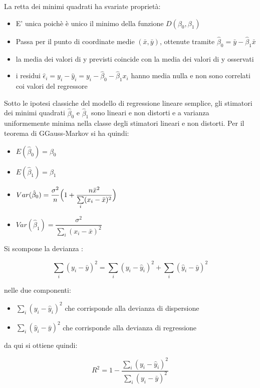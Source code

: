 \documentclass[a4paper]{extarticle}
\begin{document}
La retta dei minimi quadrati ha svariate proprietà:
\begin{itemize}
\item E' unica poichè è unico il minimo della funzione $D(\beta_0,\beta_1)$
\item Passa per il punto di coordinate medie $(\bar x, \bar y)$, ottenute tramite $\hat \beta_0 = \bar y - \hat \beta_1 \bar x$
\item la media dei valori di y previsti coincide con la media dei valori di y osservati
\item i residui $\hat \epsilon_i = y_i - \hat y_i = y_i - \hat \beta_0 - \hat \beta_1 x_i$ hanno media nulla e non sono correlati coi valori del regressore
\end{itemize} 

Sotto le ipotesi classiche del modello di regressione lineare semplice, gli stimatori dei minimi quadrati $\hat \beta_0$ e $\hat \beta_1$ sono lineari e non distorti e a varianza uniformemente minima nella classe degli stimatori lineari e non distorti. Per il teorema di GGauss-Markov si ha quindi:
\begin{itemize}
\item $E(\hat \beta_0) = \beta_0$
\item $E(\hat \beta_1) = \beta_1$ 
\item $Var(\hat \beta_0) =  \dfrac{\sigma^2}{n}\Bigl(1+\dfrac{n \bar x^2}{\sum\limits_i(x_i-\bar x)^2}\Bigr)$ 
\item $Var(\hat \beta_1) = \dfrac{\sigma^2}{\sum\limits_i (x_i- \bar x)^2}$ 
\end{itemize}

Si scompone la devianza :

\begin{equation*}
\sum\limits_i (y_i - \bar y)^2 = \sum\limits_i(y_i - \hat y_i)^2 + \sum\limits_i(\hat y_i - \bar y)^2
\end{equation*}

 nelle due componenti:
 
 \begin{itemize}
 \item $\sum\limits_i(y_i - \hat y_i)^2$ che corrisponde alla devianza di dispersione
 \item $ \sum\limits_i(\hat y_i - \bar y)^2$ che corrisponde alla devianza di regressione
 \end{itemize}
 
 da qui si ottiene quindi:
 
 \begin{equation*}
R^2 = 1 - \dfrac{\sum\limits_i(y_i - \hat y_i)^2}{\sum\limits_i (y_i - \bar y)^2} 
\end{equation*}
\end{document}
